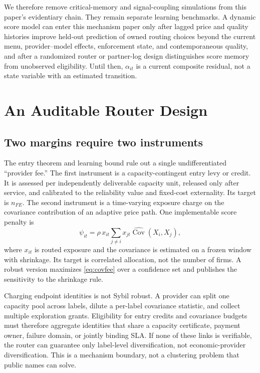 \documentclass[sigconf,nonacm]{acmart}
\newcommand{\1}{\mathbf 1}
\begin{document}
We therefore remove critical-memory and signal-coupling simulations from this
paper's evidentiary chain.  They remain separate learning benchmarks.  A dynamic
score model can enter this mechanism paper only after lagged price and quality
histories improve held-out prediction of owned routing choices beyond the
current menu, provider--model effects, enforcement state, and contemporaneous
quality, and after a randomized router or partner-log design distinguishes
score memory from unobserved eligibility.  Until then, $\alpha_{it}$ is a
current composite residual, not a state variable with an estimated transition.

\section{An Auditable Router Design}
\label{sec:design}

\subsection{Two margins require two instruments}

The entry theorem and learning bound rule out a single undifferentiated
``provider fee.''  The first instrument is a capacity-contingent entry levy or
credit.  It is assessed per independently deliverable capacity unit, released
only after service, and calibrated to the reliability value and fixed-cost
externality.  Its target is $n_{FE}$.  The second instrument is a time-varying
exposure charge on the covariance contribution of an adaptive price path.  One
implementable score penalty is
\begin{equation}
 \psi_{it}=\rho\,x_{it}\sum_{j\ne i}x_{jt}
 \widehat{\operatorname{Cov}}(X_i,X_j),
 \label{eq:covfee}
\end{equation}
where $x_{it}$ is routed exposure and the covariance is estimated on a frozen
window with shrinkage.  Its target is correlated allocation, not the number of
firms.  A robust version maximizes \eqref{eq:covfee} over a confidence set and
publishes the sensitivity to the shrinkage rule.

Charging endpoint identities is not Sybil robust.  A provider can split one
capacity pool across labels, dilute a per-label covariance statistic, and collect
multiple exploration grants.  Eligibility for entry credits and covariance
budgets must therefore aggregate identities that share a capacity certificate,
payment owner, failure domain, or jointly binding SLA.  If none of these links is
verifiable, the router can guarantee only label-level diversification, not
economic-provider diversification.  This is a mechanism boundary, not a
clustering problem that public names can solve.
\end{document}
